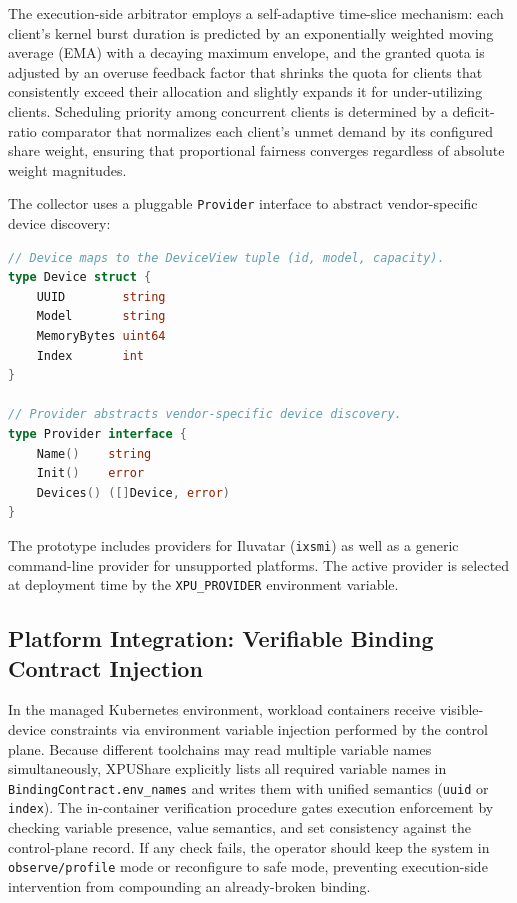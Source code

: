 \documentclass[runningheads,a4paper]{llncs}
\begin{document}
The execution-side arbitrator employs a self-adaptive time-slice
mechanism: each client's kernel burst duration is predicted by an
exponentially weighted moving average (EMA) with a decaying maximum
envelope, and the granted quota is adjusted by an overuse feedback
factor that shrinks the quota for clients that consistently exceed their
allocation and slightly expands it for under-utilizing clients.
Scheduling priority among concurrent clients is determined by a
deficit-ratio comparator that normalizes each client's unmet demand by
its configured share weight, ensuring that proportional fairness
converges regardless of absolute weight magnitudes.

The collector uses a pluggable \texttt{Provider} interface to abstract
vendor-specific device discovery:

\begin{lstlisting}[language=Go,caption={Pluggable provider abstraction (simplified).}]
// Device maps to the DeviceView tuple (id, model, capacity).
type Device struct {
    UUID        string
    Model       string
    MemoryBytes uint64
    Index       int
}

// Provider abstracts vendor-specific device discovery.
type Provider interface {
    Name()    string
    Init()    error
    Devices() ([]Device, error)
}
\end{lstlisting}

\noindent The prototype includes providers for Iluvatar (\texttt{ixsmi}) as well as a generic command-line provider for
unsupported platforms. The active provider is selected at deployment time by the \texttt{XPU\_PROVIDER} environment variable.

\subsection{Platform Integration: Verifiable Binding Contract Injection}

In the managed Kubernetes environment, workload containers receive visible-device
constraints via environment variable injection performed by the control
plane. Because different toolchains may read multiple variable names
simultaneously, XPUShare explicitly lists all required variable names in
\texttt{BindingContract.\allowbreak env\_names} and writes them with unified
semantics (\texttt{uuid} or \texttt{index}). The in-container verification
procedure gates execution enforcement by checking variable presence, value
semantics, and set consistency against the control-plane record. If any check fails, the operator should keep the system in \texttt{observe/profile} mode or reconfigure to safe mode, preventing execution-side intervention from compounding an
already-broken binding.
\end{document}
